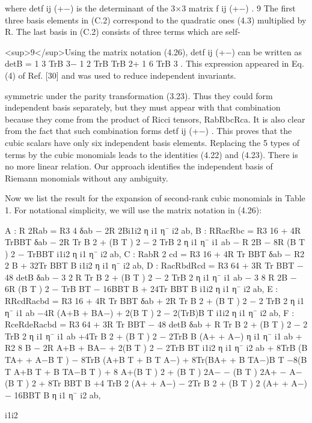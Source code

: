 \documentclass{article}
\begin{document}
where detf ij (+−) is the determinant of the 3×3 matrix f ij (+−) . 9 The first three basis elements in (C.2) correspond to the quadratic ones (4.3) multiplied by R. The last basis in (C.2) consists of three terms which are self-

<sup>9</sup>Using the matrix notation (4.26), detf ij (+−) can be written as detB = 1 3 TrB 3− 1 2 TrB TrB 2+ 1 6 TrB 3 . This expression appeared in Eq. (4) of Ref. [30] and was used to reduce independent invariants.

symmetric under the parity transformation (3.23). Thus they could form independent basis separately, but they must appear with that combination because they come from the product of Ricci tensors, RabRbcRca. It is also clear from the fact that such combination forms detf ij (+−) . This proves that the cubic scalars have only six independent basis elements. Replacing the 5 types of terms by the cubic monomials leads to the identities (4.22) and (4.23). There is no more linear relation. Our approach identifies the independent basis of Riemann monomials without any ambiguity.

Now we list the result for the expansion of second-rank cubic monomials in Table 1. For notational simplicity, we will use the matrix notation in (4.26):

A : R 2Rab = R3 4 δab − 2R 2Bi1i2 η i1 η¯ i2 ab, B : RRacRbc = R3 16 + 4R TrBBT δab − 2R Tr B 2 + (B T ) 2 − 2 TrB 2 η i1 η¯ i1 ab − R 2B − 8R (B T ) 2 − TrBBT i1i2 η i1 η¯ i2 ab, C : RabR 2 cd = R3 16 + 4R Tr BBT δab − R2 2 B + 32Tr BBT B i1i2 η i1 η¯ i2 ab, D : RacRbdRcd = R3 64 + 3R Tr BBT − 48 detB δab − 3 2 R Tr B 2 + (B T ) 2 − 2 TrB 2 η i1 η¯ i1 ab − 3 8 R 2B − 6R (B T ) 2 − TrB BT − 16BBT B + 24Tr BBT B i1i2 η i1 η¯ i2 ab, E : RRcdRacbd = R3 16 + 4R Tr BBT δab + 2R Tr B 2 + (B T ) 2 − 2 TrB 2 η i1 η¯ i1 ab −4R (A+B + BA−) + 2(B T ) 2 − 2(TrB)B T i1i2 η i1 η¯ i2 ab, F : RceRdeRacbd = R3 64 + 3R Tr BBT − 48 detB δab + R Tr B 2 + (B T ) 2 − 2 TrB 2 η i1 η¯ i1 ab +4Tr B 2 + (B T ) 2 − 2TrB B (A+ + A−) η i1 η¯ i1 ab + R2 8 B − 2R A+B + BA− + 2(B T ) 2 − 2TrB BT i1i2 η i1 η¯ i2 ab + 8TrB (B TA+ + A−B T ) − 8TrB (A+B T + B T A−) + 8Tr(BA+ + B TA−)B T −8(B T A+B T + B TA−B T ) + 8 A+(B T ) 2 + (B T ) 2A− − (B T ) 2A+ − A−(B T ) 2 + 8Tr BBT B +4 TrB 2 (A+ + A−) − 2Tr B 2 + (B T ) 2 (A+ + A−) − 16BBT B η i1 η¯ i2 ab,

i1i2
\end{document}
